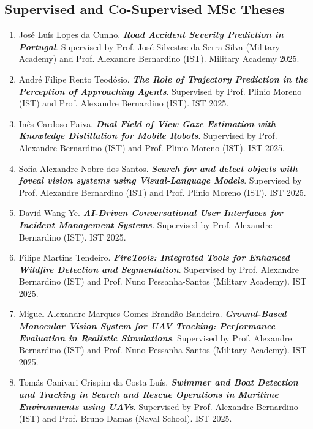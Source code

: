 \documentclass[
]{article}
\begin{document}
\subsection{Supervised and Co-Supervised MSc
Theses}\label{supervised-and-co-supervised-msc-theses}

\begin{enumerate}
\def\labelenumi{\arabic{enumi}.}
\item
  José Luís Lopes da Cunho. \emph{\textbf{Road Accident Severity
  Prediction in Portugal}}. Supervised by Prof. José Silvestre da Serra
  Silva (Military Academy) and Prof. Alexandre Bernardino (IST).
  Military Academy 2025.
\item
  André Filipe Rento Teodósio. \emph{\textbf{The Role of Trajectory
  Prediction in the Perception of Approaching Agents}}. Supervised by
  Prof. Plinio Moreno (IST) and Prof. Alexandre Bernardino (IST). IST
  2025.
\item
  Inês Cardoso Paiva. \emph{\textbf{Dual Field of View Gaze Estimation
  with Knowledge Distillation for Mobile Robots}}. Supervised by Prof.
  Alexandre Bernardino (IST) and Prof. Plinio Moreno (IST). IST 2025.
\item
  Sofia Alexandre Nobre dos Santos. \emph{\textbf{Search for and detect
  objects with foveal vision systems using Visual-Language Models}}.
  Supervised by Prof. Alexandre Bernardino (IST) and Prof. Plinio Moreno
  (IST). IST 2025.
\item
  David Wang Ye. \emph{\textbf{AI-Driven Conversational User Interfaces
  for Incident Management Systems}}. Supervised by Prof. Alexandre
  Bernardino (IST). IST 2025.
\item
  Filipe Martins Tendeiro. \emph{\textbf{FireTools: Integrated Tools for
  Enhanced Wildfire Detection and Segmentation}}. Supervised by Prof.
  Alexandre Bernardino (IST) and Prof. Nuno Pessanha-Santos (Military
  Academy). IST 2025.
\item
  Miguel Alexandre Marques Gomes Brandão Bandeira.
  \emph{\textbf{Ground-Based Monocular Vision System for UAV Tracking:
  Performance Evaluation in Realistic Simulations}}. Supervised by Prof.
  Alexandre Bernardino (IST) and Prof. Nuno Pessanha-Santos (Military
  Academy). IST 2025.
\item
  Tomás Canivari Crispim da Costa Luís. \emph{\textbf{Swimmer and Boat
  Detection and Tracking in Search and Rescue Operations in Maritime
  Environments using UAVs}}. Supervised by Prof. Alexandre Bernardino
  (IST) and Prof. Bruno Damas (Naval School). IST 2025.

\end{enumerate}
\end{document}
